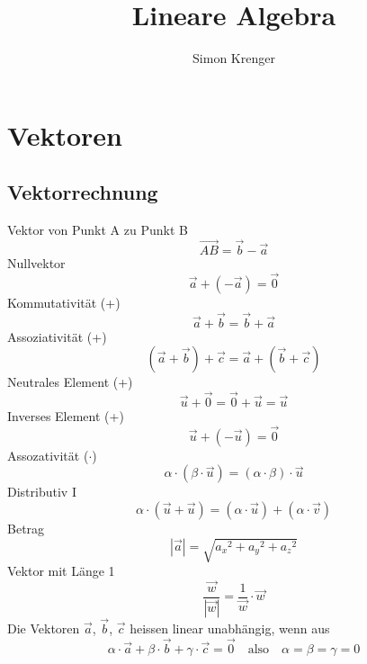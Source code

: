 \documentclass{report}
\title{Lineare Algebra}
\author{Simon Krenger}
\begin{document}
\maketitle
\chapter{Vektoren}
\section{Vektorrechnung}
Vektor von Punkt A zu Punkt B\begin{equation}\vec{AB} = \vec{b} - \vec{a}\end{equation}
Nullvektor\begin{equation}\vec{a} + (- \vec{a}) = \vec{0}\end{equation}
Kommutativität (+)\begin{equation}\vec{a} + \vec{b} = \vec{b} + \vec{a}\end{equation}
Assoziativität (+)\begin{equation}(\vec{a} + \vec{b}) + \vec{c} = \vec{a} + (\vec{b} + \vec{c})\end{equation}
Neutrales Element (+)\begin{equation}\vec{u} + \vec{0} = \vec{0} + \vec{u} = \vec{u}\end{equation}
Inverses Element (+)\begin{equation}\vec{u} + (- \vec{u}) = \vec{0}\end{equation}
Assozativität ($\cdot$)\begin{equation}\alpha \cdot (\beta \cdot \vec{u}) = (\alpha \cdot \beta) \cdot \vec{u}\end{equation}
Distributiv I\begin{equation}\alpha \cdot (\vec{u} + \vec{u})  = (\alpha \cdot \vec{u})+(\alpha \cdot \vec{v})\end{equation}
Betrag\begin{equation}|\vec{a}| = \sqrt{{a_x}^2+{a_y}^2+{a_z}^2}\end{equation}
Vektor mit Länge 1\begin{equation}\frac{\vec{w}}{|\vec{w}|} = \frac{1}{\vec{w}} \cdot \vec{w}\end{equation}
Die Vektoren $\vec{a}$, $\vec{b}$, $\vec{c}$ heissen linear unabhängig, wenn aus 
\begin{equation}\alpha \cdot \vec{a} + \beta \cdot \vec{b} + \gamma \cdot \vec{c} = \vec{0} \quad \mbox{also} \quad \alpha = \beta = \gamma = 0\end{equation}
\end{document}
